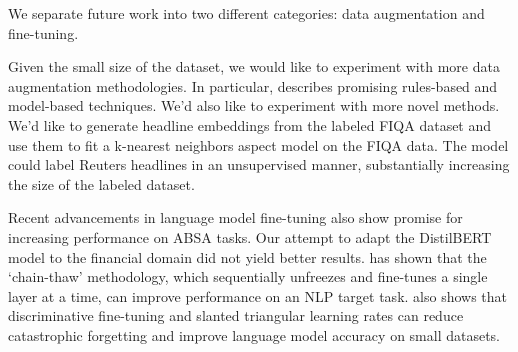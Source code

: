 We separate future work into two different categories: data augmentation and fine-tuning.



Given the small size of the dataset, we would like to experiment with more data augmentation methodologies.
In particular, \cite{feng-etal-2021-survey} describes promising rules-based and model-based techniques.
We’d also like to experiment with more novel methods.
We’d like to generate headline embeddings from the labeled FIQA dataset and use them to fit a k-nearest neighbors aspect model on the FIQA data.
The model could label Reuters headlines in an unsupervised manner, substantially increasing the size of the labeled dataset.



Recent advancements in language model fine-tuning also show promise for increasing performance on ABSA tasks.
Our attempt to adapt the DistilBERT model to the financial domain did not yield better results.
\cite{felbo2017} has shown that the ‘chain-thaw’ methodology, which sequentially unfreezes and fine-tunes a single layer at a time, can improve performance on an NLP target task.
\cite{howard-ruder-2018-universal} also shows that discriminative fine-tuning and slanted triangular learning rates can reduce catastrophic forgetting and improve language model accuracy on small datasets.
